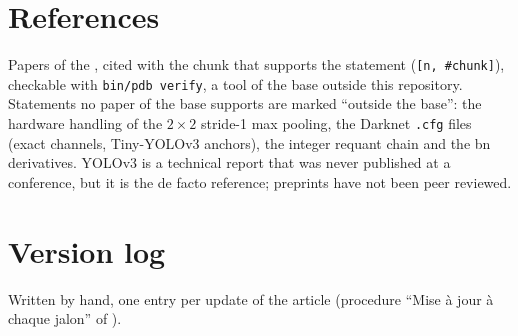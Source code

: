 \documentclass[11pt,a4paper]{article}
\begin{document}

\printnoidxglossary[type=abbreviations,title={Glossary of acronyms}]
\printnoidxglossary[type=main,title={Lexicon}]

\section*{References}

Papers of the , cited with the chunk that supports the statement
(\texttt{[n, \#chunk]}), checkable with \texttt{bin/pdb verify}, a tool of the \gls{base} outside
this repository. Statements no paper of the \gls{base} supports are marked ``outside the \gls{base}'':
the hardware handling of the $2\times2$ stride-1 max pooling, the Darknet \texttt{.cfg}
files (exact channels, Tiny-YOLOv3 \glspl{anchor}), the integer \gls{requant} chain and the \gls{bn}
derivatives. YOLOv3 is a technical report that was never published at a conference, but
it is the de facto reference; preprints have not been peer reviewed.

\renewcommand{\refname}{}
\vspace{-2.5em}



\appendix
\section{Version log}

Written by hand, one entry per update of the article (procedure ``Mise à jour à chaque
jalon'' of ).
\end{document}
